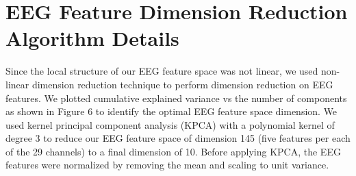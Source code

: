 \documentclass[letterpaper, 10 pt, conference]{ieeeconf}  %
\begin{document}
 















\section{EEG Feature Dimension Reduction Algorithm Details}

Since the local structure of our EEG feature space was not linear, we used non-linear dimension reduction technique to perform dimension reduction on EEG features. We plotted cumulative explained variance vs the number of components as shown in Figure 6 to identify the optimal EEG feature space dimension. We used kernel principal component analysis (KPCA) \cite{mika1999kernel} with a polynomial kernel of degree 3 to reduce our EEG feature space of dimension 145 (five features per each of the 29 channels) to a final dimension of 10. Before applying KPCA, the EEG features were normalized by removing the mean and scaling to unit variance. 
\end{document}
